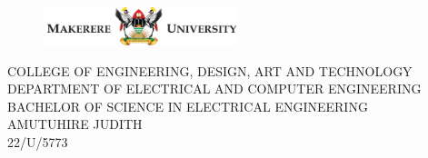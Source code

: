 \documentclass[12pt,a4paper]{report}
\begin{document}
\begin{titlepage}
    \begin{center}
        \begin{figure}[H]
            \centering
            \includegraphics[width=0.5\textwidth]{mak_logo.png} %
        \end{figure}

        \vspace{20pt}

        \large COLLEGE OF ENGINEERING, DESIGN, ART AND TECHNOLOGY\\
        \vspace{10pt}
        DEPARTMENT OF ELECTRICAL AND COMPUTER ENGINEERING\\
        \vspace{20pt}
        BACHELOR OF SCIENCE IN ELECTRICAL ENGINEERING\\
        \vspace{20pt}
        AMUTUHIRE JUDITH\\
        \vspace{20pt}
        22/U/5773\\
        \vspace{20pt}


\end{center}
\end{titlepage}
\end{document}
